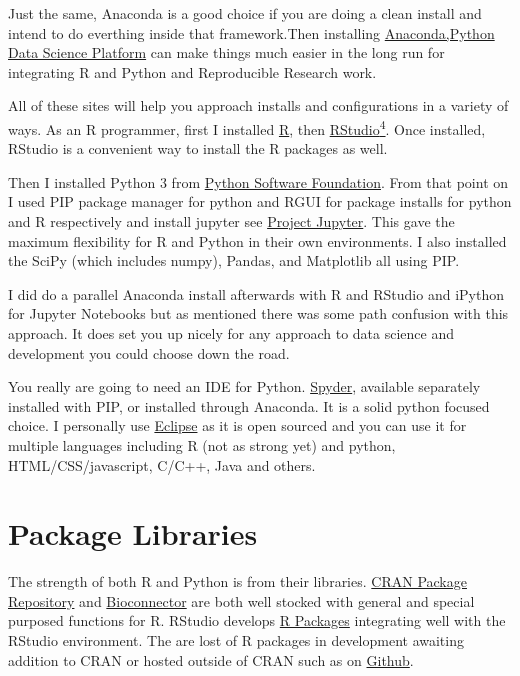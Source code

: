 \documentclass[]{book}
\theoremstyle{definition}
\theoremstyle{definition}
\theoremstyle{definition}
\theoremstyle{remark}
\begin{document}
Just the same, Anaconda is a good choice if you are doing a clean
install and intend to do everthing inside that framework.Then installing
\href{https://www.anaconda.com/}{Anaconda,Python Data Science Platform}
can make things much easier in the long run for integrating R and Python
and Reproducible Research work.

All of these sites will help you approach installs and configurations in
a variety of ways. As an R programmer, first I installed
\href{https://www.r-project.org/}{R}, then
\href{https://www.rstudio.com/}{RStudio\textsuperscript{4}}. Once
installed, RStudio is a convenient way to install the R packages as
well.

Then I installed Python 3 from \href{https://www.python.org/}{Python
Software Foundation}. From that point on I used PIP package manager for
python and RGUI for package installs for python and R respectively and
install jupyter see \href{http://jupyter.org/install}{Project Jupyter}.
This gave the maximum flexibility for R and Python in their own
environments. I also installed the SciPy (which includes numpy), Pandas,
and Matplotlib all using PIP.

I did do a parallel Anaconda install afterwards with R and RStudio and
iPython for Jupyter Notebooks but as mentioned there was some path
confusion with this approach. It does set you up nicely for any approach
to data science and development you could choose down the road.

You really are going to need an IDE for Python.
\href{https://www.spyder-ide.org/}{Spyder}, available separately
installed with PIP, or installed through Anaconda. It is a solid python
focused choice. I personally use
\href{https://www.eclipse.org/}{Eclipse} as it is open sourced and you
can use it for multiple languages including R (not as strong yet) and
python, HTML/CSS/javascript, C/C++, Java and others.

\section{Package Libraries}\label{package-libraries}

The strength of both R and Python is from their libraries.
\href{https://cran.cnr.berkeley.edu/index.html}{CRAN Package Repository}
and \href{http://www.bioconductor.org/about/}{Bioconnector} are both
well stocked with general and special purposed functions for R. RStudio
develops \href{https://www.rstudio.com/products/rpackages/}{R Packages}
integrating well with the RStudio environment. The are lost of R
packages in development awaiting addition to CRAN or hosted outside of
CRAN such as on \href{https://github.com/search?q=R+language}{Github}.
\end{document}
